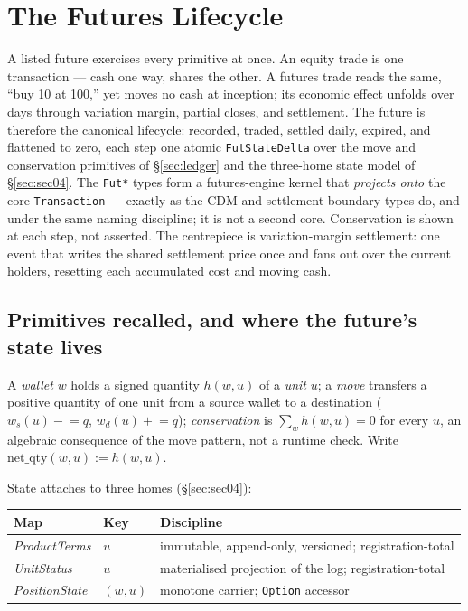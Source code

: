 \section{The Futures Lifecycle}
\label{sec:sec08}

\providecommand{\code}[1]{\texttt{#1}}
\providecommand{\ac}{\texttt{ac}}
\providecommand{\netq}{\mathrm{net\_qty}}
\providecommand{\unit}{u_{F}}
\providecommand{\mult}{m}

A listed future exercises every primitive at once. An equity trade is one transaction --- cash one
way, shares the other. A futures trade reads the same, ``buy 10 at 100,'' yet moves no cash at
inception; its economic effect unfolds over days through variation margin, partial closes, and
settlement. The future is therefore the canonical lifecycle: recorded, traded, settled daily,
expired, and flattened to zero, each step one atomic \code{FutStateDelta} over the move and
conservation primitives of \S\ref{sec:ledger} and the three-home state model of \S\ref{sec:sec04}.
The \code{Fut*} types form a futures-engine kernel that \emph{projects onto} the core
\code{Transaction} --- exactly as the CDM and settlement boundary types do, and under the same
naming discipline; it is not a second core. Conservation is shown at each step, not asserted. The centrepiece is variation-margin settlement:
one event that writes the shared settlement price once and fans out over the current holders,
resetting each accumulated cost and moving cash.

\subsection{Primitives recalled, and where the future's state lives}

A \emph{wallet} $w$ holds a signed quantity $h(w,u)$ of a \emph{unit} $u$; a \emph{move} transfers a
positive quantity of one unit from a source wallet to a destination ($w_s(u)\mathrel{-}=q$,
$w_d(u)\mathrel{+}=q$); \emph{conservation} is $\sum_w h(w,u)=0$ for every $u$, an algebraic
consequence of the move pattern, not a runtime check. Write $\netq(w,u):=h(w,u)$.

State attaches to three homes (\S\ref{sec:sec04}):

\begin{center}\small
\begin{tabular}{@{}lll@{}}
\toprule
\textbf{Map} & \textbf{Key} & \textbf{Discipline} \\
\midrule
\emph{ProductTerms}  & $u$     & immutable, append-only, versioned; registration-total \\
\emph{UnitStatus}    & $u$     & materialised projection of the log; registration-total \\
\emph{PositionState} & $(w,u)$ & monotone carrier; \code{Option} accessor \\
\bottomrule
\end{tabular}
\end{center}


